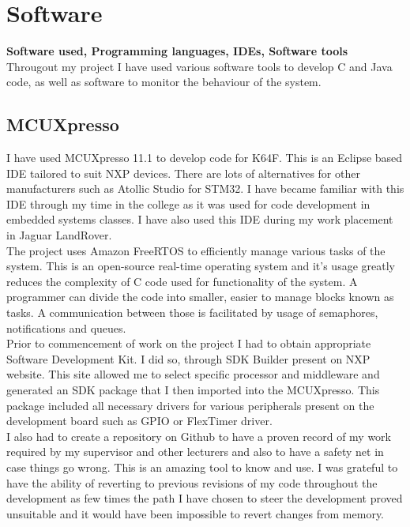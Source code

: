 \documentclass[12pt,a4paper]{article}
\begin{document}
	\section{Software}
	{\bfseries Software used, Programming languages, IDEs, Software tools}\\
	Througout my project I have used various software tools to develop C and Java code, as well as
	software to monitor the behaviour of the system.
	
		\subsection{MCUXpresso}
		
		
		I have used MCUXpresso 11.1 to develop code for K64F. This is an Eclipse based IDE tailored to suit NXP devices. There are lots of alternatives for other manufacturers such as Atollic Studio for STM32. I have became familiar with this IDE through my time in the college as it 
		was used for code development in embedded systems classes. I have also used this IDE during my work placement in Jaguar LandRover.\\
		
		The project uses Amazon FreeRTOS to efficiently manage various tasks of the system. This is an open-source real-time operating system and it's usage greatly reduces the complexity of  C code used for functionality of the system. A programmer can divide the code into smaller, easier to manage blocks known as tasks. A communication between those is facilitated by usage of semaphores, notifications and queues.\\
		
		Prior to commencement of work on the project I had to obtain appropriate Software
		Development Kit. I did so, through SDK Builder present on NXP website. This site allowed 
		me to select specific processor and middleware and generated an SDK package that I then 
		imported into the MCUXpresso. This package included all necessary drivers for various 
		peripherals present on the development board such as GPIO or FlexTimer driver.\\
		
		I also had to create a repository on Github to have a proven record of my work required 
		by my supervisor and other lecturers and also to have a safety net in case things go 
		wrong. This is an amazing tool to know and use. I was grateful to have the ability of 
		reverting to previous revisions of my code throughout the development as few times the  
		path I have chosen to steer the development proved unsuitable and it would have been  
		impossible to revert changes from memory.
		\newpage
	
\end{document}
